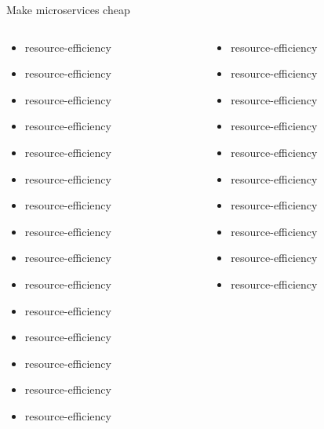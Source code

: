 \documentclass{beamer}
\begin{document}
\begin{frame}{Make microservices cheap}
    \begin{columns}
        \begin{column}{0.36\textwidth}
            \begin{itemize}
                \item resource-efficiency
                \item resource-efficiency
                \item resource-efficiency
                \item resource-efficiency
                \item resource-efficiency
                \item resource-efficiency
                \item resource-efficiency
                \item resource-efficiency
                \item resource-efficiency
                \item resource-efficiency
                \item resource-efficiency
                \item resource-efficiency
                \item resource-efficiency
                \item resource-efficiency
                \item resource-efficiency
            \end{itemize}
        \end{column}
        \begin{column}{0.36\textwidth}
            \begin{itemize}
                \item resource-efficiency
                \item resource-efficiency
                \item resource-efficiency
                \item resource-efficiency
                \item resource-efficiency
                \item resource-efficiency
                \item resource-efficiency
                \item resource-efficiency
                \item resource-efficiency
                \item resource-efficiency

\end{itemize}
\end{column}
\end{columns}
\end{frame}
\end{document}
